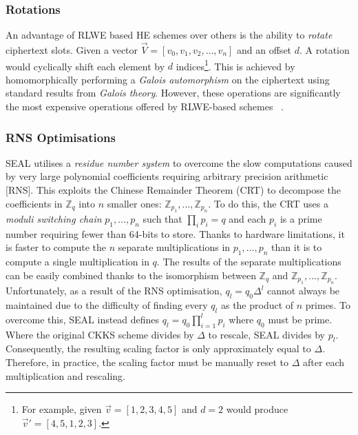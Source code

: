 \setlength{\leftskip}{0cm}
\subsubsection{Rotations}
\setlength{\leftskip}{0.5cm}
\indent \indent
An advantage of RLWE based HE schemes over others is the ability to \textit{rotate} ciphertext slots. Given a vector $\vec{V} = [v_0, v_1, v_2, \ldots, v_n]$ and an offset $d$. A rotation would cyclically shift each element by $d$ indices\footnote{For example, given $\vec{v} = [1, 2, 3, 4, 5]$ and $d = 2$ would produce $\vec{v}' = [4, 5, 1, 2, 3]$.}. This is achieved by homomorphically performing a \textit{Galois automorphism} on the ciphertext using standard results from \textit{Galois theory}. However, these operations are significantly the most expensive operations offered by RLWE-based schemes ~\cite{RotationBad}.

\setlength{\leftskip}{0cm}
\subsubsection{RNS Optimisations}
\setlength{\leftskip}{0.5cm}
\indent \indent
SEAL utilises a \textit{residue number system} \cite{RNS} to overcome the slow computations caused by very large polynomial coefficients requiring arbitrary precision arithmetic [RNS]. This exploits the Chinese Remainder Theorem (CRT) to decompose the coefficients in $\mathbb{Z}_q$ into $n$ smaller ones: $\mathbb{Z}_{p_1}, \ldots, \mathbb{Z}_{p_n}$. To do this, the CRT uses a \textit{moduli switching chain} $p_1, \ldots, p_n$ such that $\prod_i p_i = q$ and each $p_i$ is a prime number requiring fewer than 64-bits to store. Thanks to hardware limitations, it is faster to compute the $n$ separate multiplications in $p_1, \ldots, p_n$ than it is to compute a single multiplication in $q$. The results of the separate multiplications can be easily combined thanks to the isomorphism between $\mathbb{Z}_q$ and $\mathbb{Z}_{p_1}, \ldots, \mathbb{Z}_{p_n}$.
\smallskip \\ \indent
Unfortunately, as a result of the RNS optimisation, $q_l = q_0 \Delta^l$ cannot always be maintained due to the difficulty of finding every $q_l$ as the product of $n$ primes. To overcome this, SEAL instead defines $q_l = q_0 \prod_{i=1}^l p_i$ where $q_0$ must be prime. Where the original CKKS scheme divides by $\Delta$ to rescale, SEAL divides by $p_l$. Consequently, the resulting scaling factor is only approximately equal to $\Delta$. Therefore, in practice, the scaling factor must be manually reset to $\Delta$ after each multiplication and rescaling.

